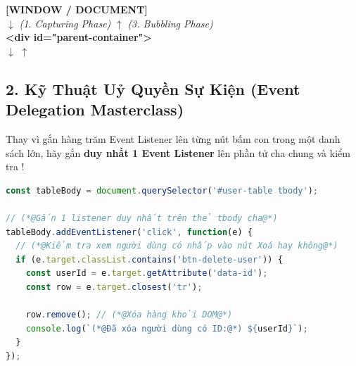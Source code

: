 \begin{browserWindow}
\sffamily\small
\centering
\begin{tcolorbox}[colback=gray!5, colframe=primaryBlue!40, arc=6pt, width=0.9\linewidth]
\centering
\textbf{\color{primaryBlue} [WINDOW / DOCUMENT]} \\[2pt]
$\downarrow$ \textit{(1. Capturing Phase)} \qquad\qquad $\uparrow$ \textit{(3. Bubbling Phase)} \\[2pt]
\textbf{<div id="parent-container">} \\[2pt]
$\downarrow$ \qquad\qquad\qquad\qquad\qquad\qquad $\uparrow$ \\[2pt]
\end{tcolorbox}
\end{browserWindow}

\subsection{2. Kỹ Thuật Uỷ Quyền Sự Kiện (Event Delegation Masterclass)}

\begin{tipBox}
Thay vì gắn hàng trăm Event Listener lên từng nút bấm con trong một danh sách lớn, hãy gắn \textbf{duy nhất 1 Event Listener} lên phần tử cha chung và kiểm tra !
\end{tipBox}

\begin{codeWindow}
\begin{lstlisting}[language=JavaScript]
const tableBody = document.querySelector('#user-table tbody');

// (*@Gắn 1 listener duy nhất trên thẻ tbody cha@*)
tableBody.addEventListener('click', function(e) {
  // (*@Kiểm tra xem người dùng có nhấp vào nút Xoá hay không@*)
  if (e.target.classList.contains('btn-delete-user')) {
    const userId = e.target.getAttribute('data-id');
    const row = e.target.closest('tr');
    
    row.remove(); // (*@Xóa hàng khỏi DOM@*)
    console.log(`(*@Đã xóa người dùng có ID:@*) ${userId}`);
  }
});
\end{lstlisting}
\end{codeWindow}

